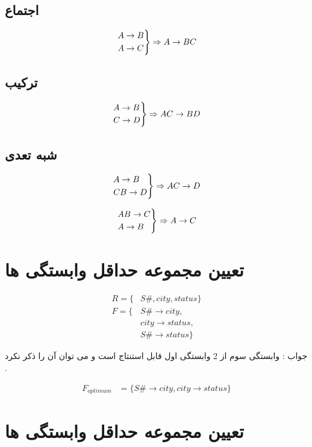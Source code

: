 \documentclass{article}
\begin{document}
\subsection{اجتماع}

\[
\begin{rcases*}
A \to B \\
A \to C
\end{rcases*} \Rightarrow A \to BC
\]


\subsection{ترکیب}

\[
\begin{rcases*}
A \to B \\
C \to D
\end{rcases*} \Rightarrow AC \to BD
\]

\subsection{شبه تعدی}


\[
\begin{rcases*}
A \to B \\
CB \to D
\end{rcases*} \Rightarrow AC \to D
\]

\[
\begin{rcases*}
AB \to C \\
A \to B
\end{rcases*} \Rightarrow A \to C
\]



\section{تعیین مجموعه حداقل وابستگی ها}


\begin{align*}
R = \{ &S\#, city , status \} \\
F = \{ &S\# \to city ,  \\
&city \to status , \\
&S\# \to status  \} 
\end{align*}


جواب : وابستگی سوم از 2 وابستگی اول قابل استنتاج است و می توان آن را ذکر نکرد .

\begin{align*}
F_{optimum} &= \{ S\# \to city ,  city \to status \} 
\end{align*}


\section{تعیین مجموعه حداقل وابستگی ها}
\end{document}
